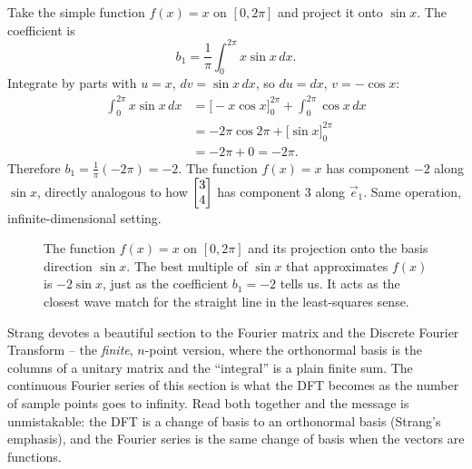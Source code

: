 \begin{example}
\label{ch37:ex-fourier}
Take the simple function $f(x)=x$ on $[0,2\pi]$ and project it onto $\sin x$. The
coefficient is
\[
  b_1 = \frac{1}{\pi}\int_0^{2\pi} x\sin x\,dx.
\]
Integrate by parts with $u=x$, $dv=\sin x\,dx$, so $du=dx$, $v=-\cos x$:
\begin{align*}
  \int_0^{2\pi} x\sin x\,dx
  &= \big[-x\cos x\big]_0^{2\pi} + \int_0^{2\pi}\cos x\,dx\\
  &= -2\pi\cos 2\pi + \big[\sin x\big]_0^{2\pi}\\
  &= -2\pi + 0 = -2\pi.
\end{align*}
Therefore $b_1 = \frac{1}{\pi}(-2\pi) = -2$. The function $f(x)=x$ has component $-2$
along $\sin x$, directly analogous to how $\begin{bmatrix}3\\4\end{bmatrix}$ has component $3$ along $\vec{e}_1$.
Same operation, infinite-dimensional setting.

\begin{figure}[H]
\centering
{}
\caption{The function $f(x)=x$ on $[0,2\pi]$ and its projection onto the basis direction $\sin x$. The best multiple of $\sin x$ that approximates $f(x)$ is $-2\sin x$, just as the coefficient $b_1=-2$ tells us. It acts as the closest wave match for the straight line in the least-squares sense.}
\label{ch37:fig-fourier-proj}
\end{figure}
\end{example}

\begin{strangbox}
Strang devotes a beautiful section to the Fourier matrix and the Discrete Fourier
Transform -- the \emph{finite}, $n$-point version, where the orthonormal basis is the
columns of a unitary matrix and the ``integral'' is a plain finite sum. The continuous
Fourier series of this section is what the DFT becomes as the number of sample
points goes to infinity. Read both together and the message is unmistakable: the DFT
is a change of basis to an orthonormal basis (Strang's emphasis), and the Fourier
series is the same change of basis when the vectors are functions.
\end{strangbox}

